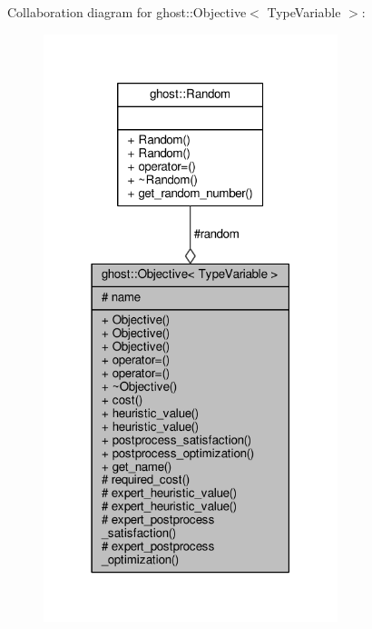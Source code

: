Collaboration diagram for ghost\+:\+:Objective$<$ Type\+Variable $>$\+:\nopagebreak
\begin{figure}[H]
\begin{center}
\leavevmode
\includegraphics[width=243pt]{classghost_1_1Objective__coll__graph}
\end{center}
\end{figure}
